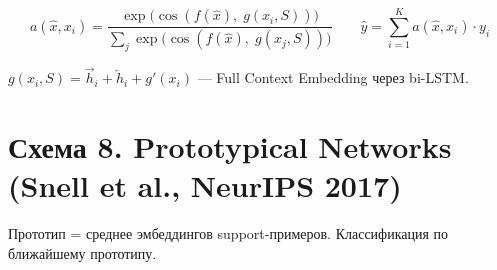 \documentclass[12pt,a4paper]{article}
\begin{document}
\[
a(\hat{x}, x_i) = \frac{\exp\!\big(\cos(f(\hat{x}),\; g(x_i, S))\big)}{\sum_j \exp\!\big(\cos(f(\hat{x}),\; g(x_j, S))\big)}
\qquad
\hat{y} = \sum_{i=1}^{K} a(\hat{x}, x_i) \cdot y_i
\]

$g(x_i, S) = \overrightarrow{h}_i + \overleftarrow{h}_i + g'(x_i)$ --- Full Context Embedding через bi-LSTM.


\newpage
\section*{Схема 8. Prototypical Networks (Snell et al., NeurIPS 2017)}

Прототип = среднее эмбеддингов support-примеров. Классификация по ближайшему прототипу.
\end{document}
